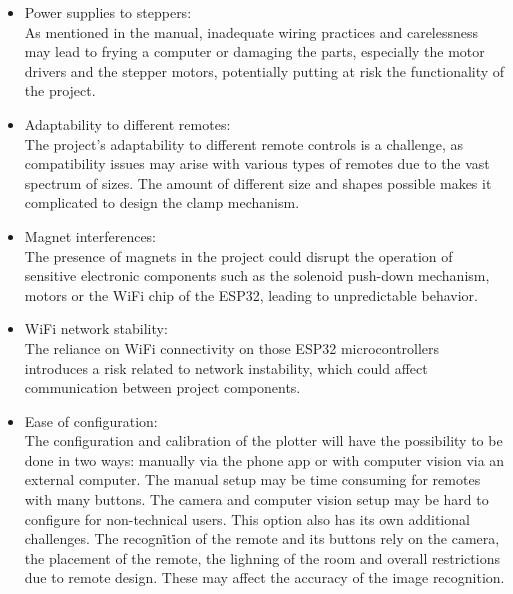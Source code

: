 \begin{itemize}
    \item Power supplies to steppers:\\
        As mentioned in the manual, inadequate wiring practices and carelessness may lead to frying a computer or damaging the parts, especially the motor drivers and the stepper motors, potentially putting at risk the functionality of the project.
    \item Adaptability to different remotes:\\
        The project's adaptability to different remote controls is a challenge, as compatibility issues may arise with various types of remotes due to the vast spectrum of sizes. The amount of different size and shapes possible makes it complicated to design the clamp mechanism. 
    \item Magnet interferences:\\
        The presence of magnets in the project could disrupt the operation of sensitive electronic components such as the solenoid push-down mechanism, motors or the WiFi chip of the ESP32, leading to unpredictable behavior.
    \item WiFi network stability:\\
        The reliance on WiFi connectivity on those ESP32 microcontrollers introduces a risk related to network instability, which could affect communication between project components.
    \item Ease of configuration:\\
        The configuration and calibration of the plotter will have the possibility to be done in two ways: manually via the phone app or with computer vision via an external computer. The manual setup may be time consuming for remotes with many buttons. 
        The camera and computer vision setup may be hard to configure for non-technical users. This option also has its own additional challenges. The recogni̇ti̇on of the remote and its buttons rely on the camera, the placement of the remote, the lighning of the room
        and overall restrictions due to remote design. These may affect the accuracy of the image recognition.
\end{itemize}
